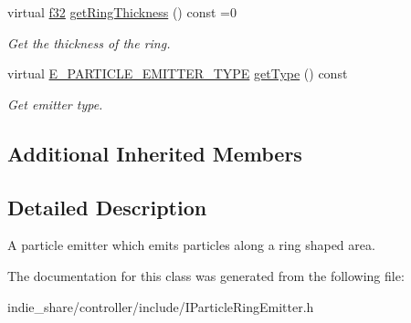 \begin{DoxyCompactItemize}
virtual \hyperlink{namespaceirr_a0277be98d67dc26ff93b1a6a1d086b07}{f32} \hyperlink{classirr_1_1scene_1_1IParticleRingEmitter_a6148ae3c6186d32f3714f83bbb71034c}{get\+Ring\+Thickness} () const =0
\begin{DoxyCompactList}\small\item\em Get the thickness of the ring. \end{DoxyCompactList}\item 
\mbox{\label{classirr_1_1scene_1_1IParticleRingEmitter_adbf6ff1bd1d25ee40e97bb17b152136f}} 
virtual \hyperlink{namespaceirr_1_1scene_a3e251a881c886884a78adea2e546272b}{E\+\_\+\+P\+A\+R\+T\+I\+C\+L\+E\+\_\+\+E\+M\+I\+T\+T\+E\+R\+\_\+\+T\+Y\+PE} \hyperlink{classirr_1_1scene_1_1IParticleRingEmitter_adbf6ff1bd1d25ee40e97bb17b152136f}{get\+Type} () const
\begin{DoxyCompactList}\small\item\em Get emitter type. \end{DoxyCompactList}\end{DoxyCompactItemize}
\subsection*{Additional Inherited Members}


\subsection{Detailed Description}
A particle emitter which emits particles along a ring shaped area. 

The documentation for this class was generated from the following file\+:\begin{DoxyCompactItemize}
\item 
indie\+\_\+share/controller/include/I\+Particle\+Ring\+Emitter.\+h\end{DoxyCompactItemize}
